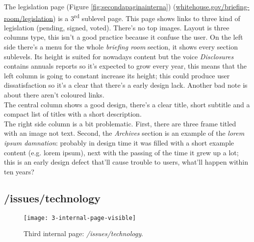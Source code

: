 \documentclass[
10pt, %
a4paper, %
oneside, %
headinclude,footinclude, %
BCOR5mm, %
]{scrartcl}
\begin{document}
	
	The legislation page (Figure \ref{fig:secondapaginainterna}) (\href{http://www.whitehouse.gov/briefing-room/legislation}{whitehouse.gov/briefing-room/legislation}) is a 3\textsuperscript{rd} sublevel page. This page shows links to three kind of legislation (pending, signed, voted). There's no top images. Layout is three columns type, this isn't a good practice because it confuse the user. On the left side there's a menu for the whole \emph{briefing room} section, it shows every section sublevels. Its height is suited for nowadays content but the voice \emph{Disclosures} contains annuals reports so it's expected to grow every year, this means that the left column is going to constant increase its height; this could produce user dissatisfaction so it's a clear that there's a early design lack. Another bad note is about there aren't coloured links. \\
	The central column shows a good design, there's a clear title, short subtitle and a compact list of titles with a short description. \\
	The right side column is a bit problematic. First, there are three frame titled with an image not text. Second, the \emph{Archives} section is an example of the \emph{lorem ipsum damnation}: probably in design time it was filled with a short example content (e.g. lorem ipsum), next with the passing of the time it grew up a lot; this is an early design defect that'll cause trouble to users, what'll happen within ten years?
	

	\subsection{/issues/technology}
	\label{terzapaginainterna} 


	\begin{figure}[h!]
	\centering 
	\centerline{\texttt{[image: 3-internal-page-visible]}}
	\caption[Third internal page: /issues/technology]{Third internal page: \emph{/issues/technology}.}
	\label{fig:terzapaginainterna} 
	\end{figure}
	
\end{document}
